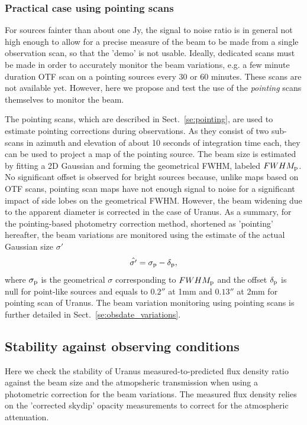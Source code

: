 \subsubsection{Practical case using pointing scans}
\label{se:photocorr_pointing}

For sources fainter than about one Jy, the signal to noise ratio is in
general not high enough to allow for a precise measure of the beam to be
made from a single observation scan, so that the 'demo' is not
usable. Ideally, dedicated scans must be made in order to accurately
monitor the beam variations, e.g. a few minute duration OTF scan on a
pointing sources every 30 or 60 minutes. These scans are not available
yet. However, here we propose and test the use of the \emph{pointing} scans
themselves to monitor the beam.

The pointing scans, which are described in Sect.~\ref{se:pointing},
are used to estimate pointing corrections during observations. As they
consist of two sub-scans in azimuth and elevation of about 10 seconds
of integration time each, they can be used to project a map of the
pointing source. The beam size is estimated by fitting a 2D Gaussian
and forming the geometrical FWHM, labeled $FWHM_{\rm{p}}$. No
significant offset is observed for bright sources because, unlike maps
based on OTF scans,
pointing scan maps have not enough signal to noise for a significant
impact of side lobes on the geometrical FWHM. However, the beam
widening due to the apparent diameter is corrected in the case of
Uranus.
As a summary, for the pointing-based photometry correction method,
shortened as 'pointing' hereafter, the
beam variations are monitored using the estimate of the
actual Gaussian size $\sigma '$ 
\begin{equation}
  \hat{\sigma '} = \sigma_{\rm{p}} - \delta_{\rm{p}}, 
\end{equation} 
where $\sigma_{\rm{p}}$ is the geometrical $\sigma$ corresponding to
$FWHM_{\rm{p}}$ and the offset $\delta_{\rm{p}}$ is null for
point-like sources and equals to $0.2''$ at 1mm and $0.13''$ at 2mm
for pointing scan of Uranus. The beam variation monitoring using
pointing scans is further detailed in
Sect.~\ref{se:obsdate_variations}.



\subsection{Stability against observing conditions}

Here we check the stability of Uranus measured-to-predicted flux
density ratio against the beam size and the atmopsheric transmission
when using a photometric correction for the beam variations.
The measured flux density relies on the 'corrected skydip' opacity
measurements to correct for the atmospheric attenuation.  

